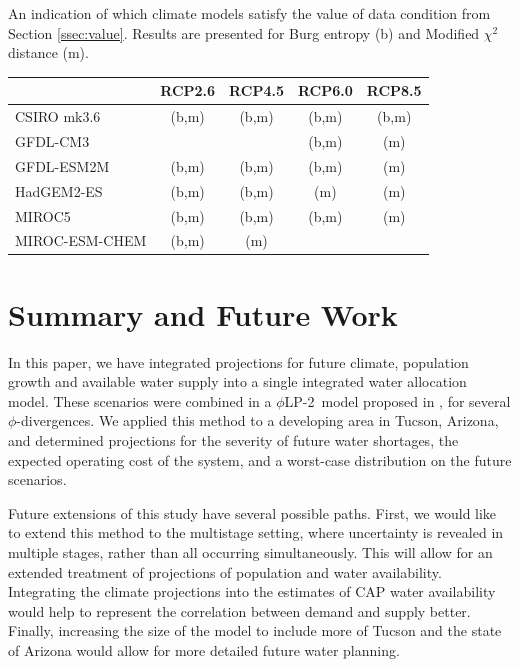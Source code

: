 \documentclass[opre,nonblindrev]{informs3} %
\newcommand{\plp}{$\phi$LP-2}
\begin{document}
\begin{table}
	\TABLE
	{
		An indication of which climate models satisfy the value of data condition from Section \ref{ssec:value}.
		Results are presented for Burg entropy (b) and Modified $\chi^2$ distance (m).
		\label{tb:value}
	}
	{\begin{tabular}{l|cccc}
		               & RCP2.6    & RCP4.5    & RCP6.0    & RCP8.5 \\
		\hline
		CSIRO mk3.6    & (b,m)     & (b,m)     & (b,m)     & (b,m)     \\
		GFDL-CM3       &           &           & (b,m)     & (m)       \\
		GFDL-ESM2M     & (b,m)     & (b,m)     & (b,m)     & (m)       \\
		HadGEM2-ES     & (b,m)     & (b,m)     & (m)       & (m)       \\
		MIROC5         & (b,m)     & (b,m)     & (b,m)     & (m)       \\
		MIROC-ESM-CHEM & (b,m)     & (m)       &           &           \\
	 \end{tabular}}
	{}
\end{table}

\section{Summary and Future Work}
\label{sec:concl}

In this paper, we have integrated projections for future climate, population growth and available water supply into a single integrated water allocation model.
These scenarios were combined in a \plp\ model proposed in \cite{love2013phi}, for several $\phi$-divergences.
We applied this method to a developing area in Tucson, Arizona, and determined projections for the severity of future water shortages, the expected operating cost of the system, and a worst-case distribution on the future scenarios.

Future extensions of this study have several possible paths.
First, we would like to extend this method to the multistage setting, where uncertainty is revealed in multiple stages, rather than all occurring simultaneously.
This will allow for an extended treatment of projections of population and water availability.
Integrating the climate projections into the estimates of CAP water availability would help to represent the correlation between demand and supply better.
Finally, increasing the size of the model to include more of Tucson and the state of Arizona would allow for more detailed future water planning.
\end{document}

